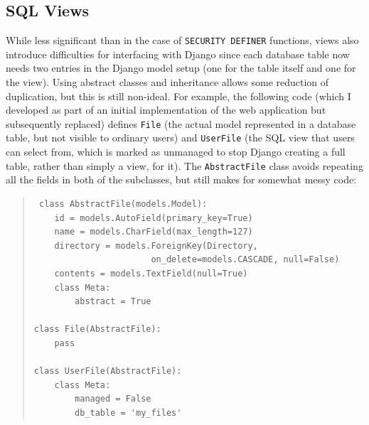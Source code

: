 \documentclass[12pt]{report}
\begin{document}
\subsection{SQL Views}
While less significant than in the case of \texttt{SECURITY DEFINER} functions, views also introduce difficulties for interfacing with Django since each database table now needs two entries in the Django model setup (one for the table itself and one for the view). Using abstract classes and inheritance allows some reduction of duplication, but this is still non-ideal. For example, the following code (which I developed as part of an initial implementation of the web application but subsequently replaced) defines \texttt{File} (the actual model represented in a database table, but not visible to ordinary users) and \texttt{UserFile} (the SQL view that users can select from, which is marked as unmanaged to stop Django creating a full table, rather than simply a view, for it). The \texttt{AbstractFile} class avoids repeating all the fields in both of the subclasses, but still makes for somewhat messy code:

\begin{quote}
\begin{verbatim}
 class AbstractFile(models.Model):
    id = models.AutoField(primary_key=True)
    name = models.CharField(max_length=127)
    directory = models.ForeignKey(Directory,
                       on_delete=models.CASCADE, null=False)
    contents = models.TextField(null=True)
    class Meta:
        abstract = True

class File(AbstractFile):
    pass

class UserFile(AbstractFile):
    class Meta:
        managed = False
        db_table = 'my_files'
\end{verbatim}
\end{quote}
\end{document}
